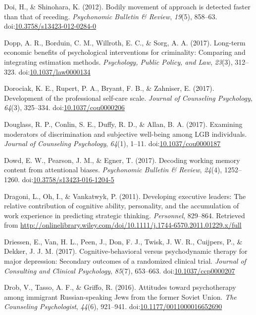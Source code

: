 \documentclass[english,man]{apa6}
\begin{document}
\hypertarget{ref-Doi2012}{}
Doi, H., \& Shinohara, K. (2012). Bodily movement of approach is
detected faster than that of receding. \emph{Psychonomic Bulletin \&
Review}, \emph{19}(5), 858--63.
doi:\href{https://doi.org/10.3758/s13423-012-0284-0}{10.3758/s13423-012-0284-0}

\hypertarget{ref-Dopp2017}{}
Dopp, A. R., Borduin, C. M., Willroth, E. C., \& Sorg, A. A. (2017).
Long-term economic benefits of psychological interventions for
criminality: Comparing and integrating estimation methods.
\emph{Psychology, Public Policy, and Law}, \emph{23}(3), 312--323.
doi:\href{https://doi.org/10.1037/law0000134}{10.1037/law0000134}

\hypertarget{ref-Dorociak2017}{}
Dorociak, K. E., Rupert, P. A., Bryant, F. B., \& Zahniser, E. (2017).
Development of the professional self-care scale. \emph{Journal of
Counseling Psychology}, \emph{64}(3), 325--334.
doi:\href{https://doi.org/10.1037/cou0000206}{10.1037/cou0000206}

\hypertarget{ref-Douglass2017}{}
Douglass, R. P., Conlin, S. E., Duffy, R. D., \& Allan, B. A. (2017).
Examining moderators of discrimination and subjective well-being among
LGB individuals. \emph{Journal of Counseling Psychology}, \emph{64}(1),
1--11. doi:\href{https://doi.org/10.1037/cou0000187}{10.1037/cou0000187}

\hypertarget{ref-Dowd2017}{}
Dowd, E. W., Pearson, J. M., \& Egner, T. (2017). Decoding working
memory content from attentional biases. \emph{Psychonomic Bulletin \&
Review}, \emph{24}(4), 1252--1260.
doi:\href{https://doi.org/10.3758/s13423-016-1204-5}{10.3758/s13423-016-1204-5}

\hypertarget{ref-Dragoni2011}{}
Dragoni, L., Oh, I., \& Vankatwyk, P. (2011). Developing executive
leaders: The relative contribution of cognitive ability, personality,
and the accumulation of work experience in predicting strategic
thinking. \emph{Personnel}, 829--864. Retrieved from
\url{http://onlinelibrary.wiley.com/doi/10.1111/j.1744-6570.2011.01229.x/full}

\hypertarget{ref-Driessen2017}{}
Driessen, E., Van, H. L., Peen, J., Don, F. J., Twisk, J. W. R.,
Cuijpers, P., \& Dekker, J. J. M. (2017). Cognitive-behavioral versus
psychodynamic therapy for major depression: Secondary outcomes of a
randomized clinical trial. \emph{Journal of Consulting and Clinical
Psychology}, \emph{85}(7), 653--663.
doi:\href{https://doi.org/10.1037/ccp0000207}{10.1037/ccp0000207}

\hypertarget{ref-Drob2016}{}
Drob, V., Tasso, A. F., \& Griffo, R. (2016). Attitudes toward
psychotherapy among immigrant Russian-speaking Jews from the former
Soviet Union. \emph{The Counseling Psychologist}, \emph{44}(6),
921--941.
doi:\href{https://doi.org/10.1177/0011000016652690}{10.1177/0011000016652690}
\end{document}
